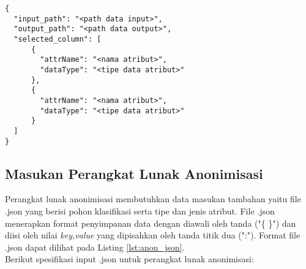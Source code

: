 \begin{lstlisting}[basicstyle=\ttfamily, frame=single,
	columns=fullflexible, keepspaces=true, breaklines=true, label=lst:eksplor_json, caption=Input JSON untuk Eksplorasi Data]
{
  "input_path": "<path data input>",
  "output_path": "<path data output>",
  "selected_column": [
      {
        "attrName": "<nama atribut>",
        "dataType": "<tipe data atribut>"
      },
      {
        "attrName": "<nama atribut>",
        "dataType": "<tipe data atribut>"
      }
  ]
}
\end{lstlisting}

\subsection{Masukan Perangkat Lunak Anonimisasi}
Perangkat lunak anonimisasi membutuhkan data masukan tambahan yaitu file .json yang berisi pohon klasifikasi serta tipe dan jenis atribut. File .json menerapkan format penyimpanan data dengan diawali oleh tanda ("\{ \}") dan diisi oleh nilai \textit{key,value} yang dipisahkan oleh tanda titik dua (":"). Format file .json dapat dilihat pada Listing \ref{lst:anon_json}.\\

\noindent Berikut spesifikasi input .json untuk perangkat lunak anonimisasi:

